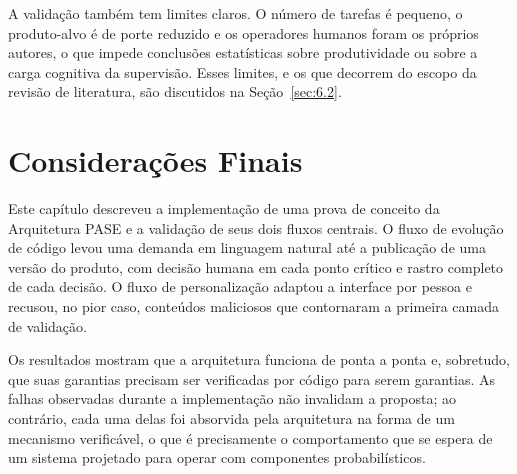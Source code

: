 A validação também tem limites claros. O número de tarefas é pequeno, o produto-alvo é de porte reduzido e os operadores humanos foram os próprios autores, o que impede conclusões estatísticas sobre produtividade ou sobre a carga cognitiva da supervisão. Esses limites, e os que decorrem do escopo da revisão de literatura, são discutidos na Seção~\ref{sec:6.2}.

\section{Considerações Finais}\label{sec:5.8}

Este capítulo descreveu a implementação de uma prova de conceito da Arquitetura PASE e a validação de seus dois fluxos centrais. O fluxo de evolução de código levou uma demanda em linguagem natural até a publicação de uma versão do produto, com decisão humana em cada ponto crítico e rastro completo de cada decisão. O fluxo de personalização adaptou a interface por pessoa e recusou, no pior caso, conteúdos maliciosos que contornaram a primeira camada de validação.

Os resultados mostram que a arquitetura funciona de ponta a ponta e, sobretudo, que suas garantias precisam ser verificadas por código para serem garantias. As falhas observadas durante a implementação não invalidam a proposta; ao contrário, cada uma delas foi absorvida pela arquitetura na forma de um mecanismo verificável, o que é precisamente o comportamento que se espera de um sistema projetado para operar com componentes probabilísticos.
